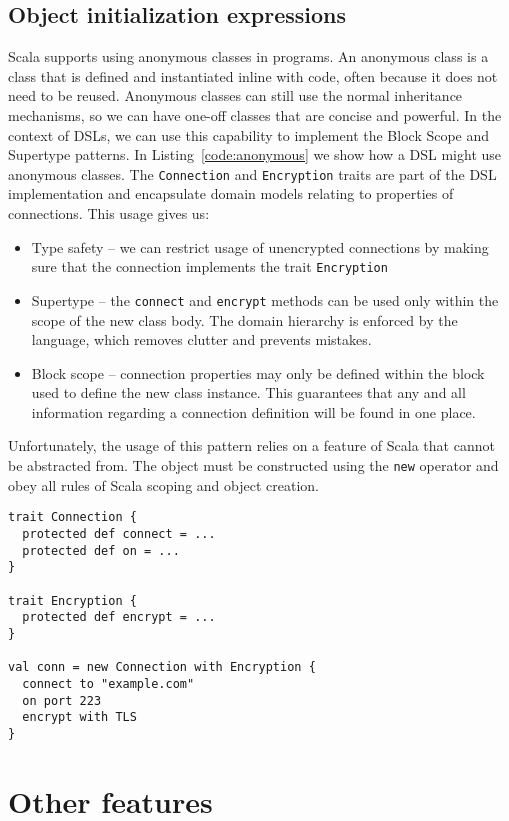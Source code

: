 \subsection{Object initialization expressions}

Scala supports using anonymous classes in programs.
An anonymous class is a class that is defined and instantiated inline with code, often because it does not need to be reused.
Anonymous classes can still use the normal inheritance mechanisms, so we can have one-off classes that are concise and powerful.
In the context of DSLs, we can use this capability to implement the Block Scope and Supertype patterns.
In Listing~\ref{code:anonymous} we show how a DSL might use anonymous classes.
The \texttt{Connection} and \texttt{Encryption} traits are part of the DSL implementation and encapsulate domain models relating to properties of connections.
This usage gives us:
\begin{itemize}
	\item Type safety -- we can restrict usage of unencrypted connections by making sure that the connection implements the trait \texttt{Encryption}
	\item Supertype -- the \texttt{connect} and \texttt{encrypt} methods can be used only within the scope of the new class body.
The domain hierarchy is enforced by the language, which removes clutter and prevents mistakes.
	\item Block scope -- connection properties may only be defined within the block used to define the new class instance.
This guarantees that any and all information regarding a connection definition will be found in one place.
\end{itemize}

Unfortunately, the usage of this pattern relies on a feature of Scala that cannot be abstracted from.
The object must be constructed using the \texttt{new} operator and obey all rules of Scala scoping and object creation.

\begin{lstlisting}[caption=Anonymous classes, label=code:anonymous]
trait Connection {
  protected def connect = ...
  protected def on = ...
}

trait Encryption {
  protected def encrypt = ...
}

val conn = new Connection with Encryption {
  connect to "example.com"
  on port 223
  encrypt with TLS
}
\end{lstlisting}

\section{Other features}

